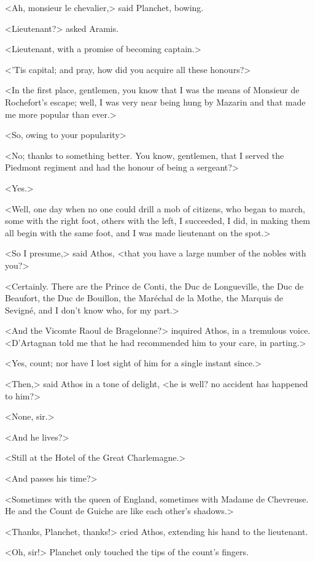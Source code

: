<Ah, monsieur le chevalier,> said Planchet, bowing.

<Lieutenant?> asked Aramis.

<Lieutenant, with a promise of becoming captain.>

<'Tis capital; and pray, how did you acquire all these honours?>

<In the first place, gentlemen, you know that I was the means of Monsieur de Rochefort's escape; well, I was very near being hung by Mazarin and that made me more popular than ever.>

<So, owing to your popularity\longdash>

<No; thanks to something better. You know, gentlemen, that I served the Piedmont regiment and had the honour of being a sergeant?>

<Yes.>

<Well, one day when no one could drill a mob of citizens, who began to march, some with the right foot, others with the left, I succeeded, I did, in making them all begin with the same foot, and I was made lieutenant on the spot.>

<So I presume,> said Athos, <that you have a large number of the nobles with you?>

<Certainly. There are the Prince de Conti, the Duc de Longueville, the Duc de Beaufort, the Duc de Bouillon, the Maréchal de la Mothe, the Marquis de Sevigné, and I don't know who, for my part.>

<And the Vicomte Raoul de Bragelonne?> inquired Athos, in a tremulous voice. <D'Artagnan told me that he had recommended him to your care, in parting.>

<Yes, count; nor have I lost sight of him for a single instant since.>

<Then,> said Athos in a tone of delight, <he is well? no accident has happened to him?>

<None, sir.>

<And he lives?>

<Still at the Hotel of the Great Charlemagne.>

<And passes his time?>

<Sometimes with the queen of England, sometimes with Madame de Chevreuse. He and the Count de Guiche are like each other's shadows.>

<Thanks, Planchet, thanks!> cried Athos, extending his hand to the lieutenant.

<Oh, sir!> Planchet only touched the tips of the count's fingers.

